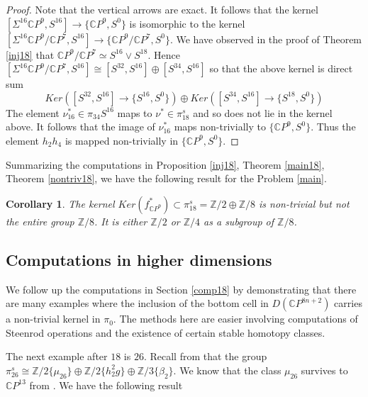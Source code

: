\documentclass[a4paper,leqno,12pt]{amsart}
\theoremstyle{plain}
\newtheorem{cor}[theorem]{Corollary}
\theoremstyle{definition}
\numberwithin{equation}{section}
\begin{document}
\begin{proof}
Note that the vertical arrows are exact. It follows that the kernel $[\Sigma^{16} {\mathbb{C}} P^9, S^{16}]      \to  \{ {\mathbb{C}} P^9, S^0\}$ is isomorphic to the kernel $[\Sigma^{16} {\mathbb{C}} P^9/ {\mathbb{C}} P^7, S^{16}]\to \{ {\mathbb{C}} P^9/{\mathbb{C}} P^7, S^0\}$. We have observed in the proof of Theorem \ref{inj18} that ${\mathbb{C}} P^9/{\mathbb{C}} P^7 \simeq S^{16} \vee S^{18}$. Hence $[\Sigma^{16} {\mathbb{C}} P^9/ {\mathbb{C}} P^7, S^{16}]\cong [S^{32},S^{16}] \oplus [S^{34},S^{16}]$ so that the above kernel is direct sum 
$$\mathit{Ker}( [S^{32},S^{16}] \to \{S^{16},S^0\})  \oplus \mathit{Ker}( [S^{34},S^{16}] \to \{S^{18},S^0\})$$
The element $\nu_{16}^\ast \in \pi_{34}S^{16}$ maps to $\nu^* \in \pi_{18}^s$ and so does not lie in the kernel above. It follows that the image of $\nu_{16}^*$ maps non-trivially to $\{{\mathbb{C}} P^9,S^0\}$. Thus the element $h_2h_4$ is mapped non-trivially in $\{{\mathbb{C}} P^9,S^0\}$.
\end{proof}

Summarizing the computations in Proposition \ref{inj18}, Theorem \ref{main18}, Theorem \ref{nontriv18}, we have the following result for the Problem \ref{main}.
\begin{cor}\label{ker9}
The kernel ${\mathit{Ker}}(f_{{\mathbb{C}} P^9}^\ast)\subset \pi_{18}^s = {\mathbb{Z}}/2 \oplus {\mathbb{Z}}/8$ is non-trivial but not the entire group ${\mathbb{Z}}/8$. It is either ${\mathbb{Z}}/2$ or ${\mathbb{Z}}/4$ as a subgroup of ${\mathbb{Z}}/8$.  
\end{cor}

\subsection{Computations in higher dimensions}\label{comph}

We follow up the computations in Section \ref{comp18} by demonstrating that there are many examples where the inclusion of the bottom cell in $D({\mathbb{C}} P^{8n+2})$ carries a non-trivial kernel in $\pi_0$. The methods here are easier involving computations of Steenrod operations and the existence of certain stable homotopy classes. 

The next example after $18$ is $26$. Recall from \cite{Rav} that the group $\pi_{26}^s\cong {\mathbb{Z}}/2\{\mu_{26}\}\oplus {\mathbb{Z}}/2\{h_2^2g\}\oplus {\mathbb{Z}}/3\{\beta_2\}$.  We know that the class $\mu_{26}$ survives to ${\mathbb{C}} P^{13}$ from \cite{Far-Jon}. We have the following result
\end{document}
